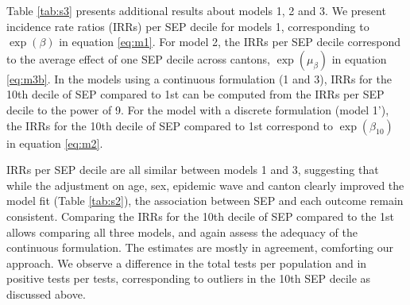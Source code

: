 \documentclass{article}
\begin{document}
	Table \ref{tab:s3} presents additional results about models 1, 2 and 3. 
	We present incidence rate ratios (IRRs) per SEP decile for models 1, corresponding to $\exp(\beta)$ in equation \ref{eq:m1}.
	For model 2, the IRRs per SEP decile correspond to the average effect of one SEP decile across cantons, $\exp(\mu_{\beta})$ in equation \ref{eq:m3b}.
	In the models using a continuous formulation (1 and 3), IRRs for the 10th decile of SEP compared to 1st can be computed from the IRRs per SEP decile to the power of 9.
	For the model with a discrete formulation (model 1'), the IRRs for the 10th decile of SEP compared to 1st correspond to $\exp(\beta_{10})$ in equation \ref{eq:m2}.
	
	IRRs per SEP decile are all similar between models 1 and 3, suggesting that while the adjustment on age, sex, epidemic wave and canton clearly improved the model fit (Table \ref{tab:s2}), the association between SEP and each outcome remain consistent.
	Comparing the IRRs for the 10th decile of SEP compared to the 1st allows comparing all three models, and again assess the adequacy of the continuous formulation. 
	The estimates are mostly in agreement, comforting our approach.
	We observe a difference in the total tests per population and in positive tests per tests, corresponding to outliers in the 10th SEP decile as discussed above.
	
	
	
\end{document}
